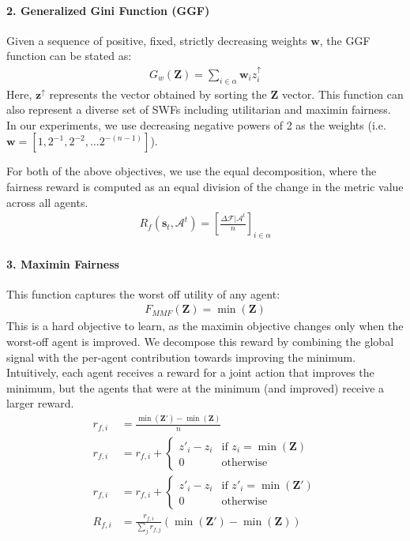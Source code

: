 \paragraph{2. \textbf{Generalized Gini Function (GGF)}}
Given a sequence of positive, fixed, strictly decreasing weights $\mathbf{w}$, the GGF function can be stated as:
\begin{align}
    G_w(\textbf{Z}) = \sum_{i\in\alpha} \mathbf{w}_i z_i^{\uparrow}
\end{align}
Here, $\textbf{z}^{\uparrow}$ represents the vector obtained by sorting the $\textbf{Z}$ vector. This function can also represent a diverse set of SWFs including utilitarian and maximin fairness. In our experiments, we use decreasing negative powers of 2 as the weights (i.e. $\mathbf{w}=[1, 2^{-1}, 2^{-2}, \dots 2^{-(n-1)}]$). 

\medskip\noindent For both of the above objectives, we use the equal decomposition, where the fairness reward is computed as an equal division of the change in the metric value across all agents.
\begin{align}
    R_f(\mathbf{s}_t, \mathcal{A}^t) = \left[ \frac{\Delta \mathcal{F}|\mathcal{A}^t}{n} \right]_{i\in\alpha}
\end{align}

\paragraph{3. \textbf{Maximin Fairness}}
This function captures the worst off utility of any agent:
\begin{align}
    F_{MMF}(\textbf{Z}) = \min(\textbf{Z})
\end{align}
This is a hard objective to learn, as the maximin objective changes only when the worst-off agent is improved. 
We decompose this reward by combining the global signal with the per-agent contribution towards improving the minimum. Intuitively, each agent receives a reward for a joint action that improves the minimum, but the agents that were at the minimum (and improved) receive a larger reward. 
\begin{align}
    r_{f,i} &= \frac{\min(\textbf{Z}') - \min(\textbf{Z})}{n} \\
    r_{f,i} &= r_{f,i} +
    \begin{cases}
        z'_i - z_i & \text{if } z_i =\min(\textbf{Z}) \\
        0 & \text{otherwise}
    \end{cases}\\
    r_{f,i} &= r_{f,i} + 
    \begin{cases}
        z'_i - z_i & \text{if } z'_i =\min(\textbf{Z}') \\
        0 & \text{otherwise}
    \end{cases}\\
    R_{f,i} &= \frac{r_{f,i}}{\sum_j r_{f,j}} \left(\min(\textbf{Z}') - \min(\textbf{Z})\right)
\end{align}

